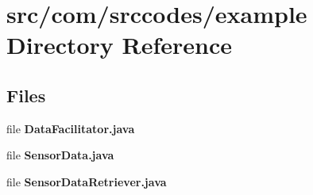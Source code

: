 \section{src/com/srccodes/example Directory Reference}
\label{dir_717aadc762cc6709b201027245559e4e}
\subsection*{Files}
\begin{DoxyCompactItemize}
\item 
file {\bf Data\-Facilitator.\-java}
\item 
file {\bf Sensor\-Data.\-java}
\item 
file {\bf Sensor\-Data\-Retriever.\-java}
\end{DoxyCompactItemize}

